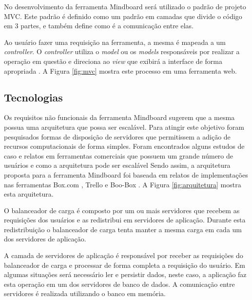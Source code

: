 No desenvolvimento da ferramenta Mindboard será utilizado o padrão de projeto MVC. Este padrão é definido como um padrão em camadas \cite{pressman} que divide o código em 3 partes, e também define como é a comunicação entre elas.

Ao usuário fazer uma requisição na ferramenta, a mesma é mapeada a um \emph{controller}. O \emph{controller} utiliza o \emph{model} ou os \emph{models} responsáveis por realizar a operação em questão e direciona ao \emph{view} que exibirá a interface de forma apropriada \cite{mvc}. A Figura \ref{fig:mvc} mostra este processo em uma ferramenta web.

\fi



\subsection{Tecnologias}
\label{sec:tecnologias}

Os requisitos não funcionais da ferramenta Mindboard sugerem que a mesma possua uma arquitetura que possa ser escalável. Para atingir este objetivo foram pesquisados formas de disposição de servidores que permitissem a adição de recursos computacionais de forma simples. Foram encontrados alguns estudos de caso e relatos em ferramentas comerciais que possuem um grande número de usuários e como a arquitetura pode ser escalável Sendo assim, a arquitetura proposta para a ferramenta Mindboard foi baseada em relatos de implementações nas ferramentas Box.com \cite{boxcom}, Trello \cite{trello} e Boo-Box \cite{boobox}. A Figura \ref{fig:arquitetura} mostra esta arquitetura.


O balanceador de carga é composto por um ou mais servidores que recebem as requisições dos usuários e as redistribui em servidores de aplicação. Durante esta redistribuição o balanceador de carga tenta manter a mesma carga em cada um dos servidores de aplicação.

A camada de servidores de aplicação é responsável por receber as requisições do balanceador de carga e processar de forma completa a requisição do usuário. Em algumas situações será necessário ler e persistir dados, neste caso, a aplicação faz esta operação em um dos servidores de banco de dados. A comunicação entre servidores é realizada utilizando o banco em memória.

